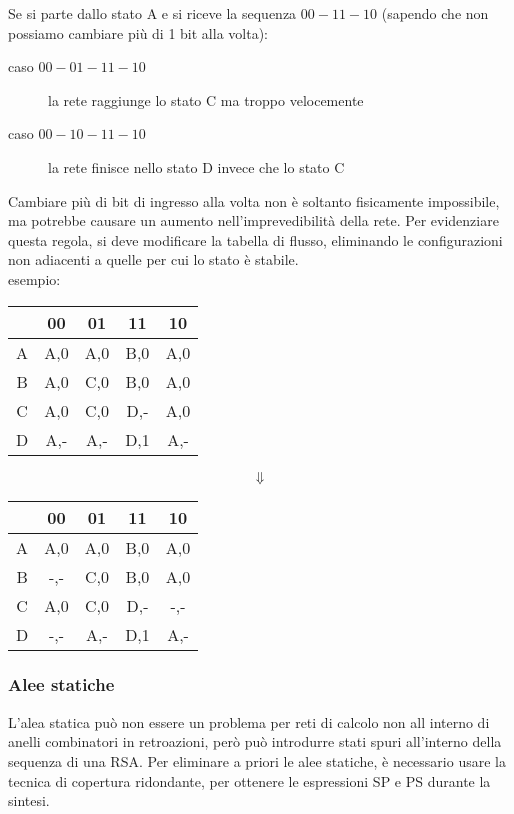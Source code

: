 \documentclass{subfiles}
\begin{document}
\noindent
Se si parte dallo stato A e si riceve la sequenza $00-11-10$ (sapendo che non possiamo cambiare più di 1 bit alla volta):

\begin{description}
	\item[caso $00-01-11-10$] la rete raggiunge lo stato C ma troppo velocemente
	\item[caso $00-10-11-10$] la rete finisce nello stato D invece che lo stato C
\end{description}

\noindent
Cambiare più di bit di ingresso alla volta non è soltanto fisicamente impossibile, ma potrebbe causare un aumento nell'imprevedibilità della rete.
Per evidenziare questa regola, si deve modificare la tabella di flusso, eliminando le configurazioni non adiacenti a quelle per cui lo stato è stabile.\\

\noindent
esempio:

\begin{center}
\begin{tabular}{ |c|c|c|c|c| }
\hline
& 00 & 01 & 11 & 10 \\
\hline
\hline
A & A,0 & A,0 & B,0 & A,0 \\
B & A,0 & C,0 & B,0 & A,0 \\
C & A,0 & C,0 & D,- & A,0 \\
D & A,- & A,- & D,1 & A,- \\
\hline
\end{tabular}

$$\Downarrow$$

\begin{tabular}{ |c|c|c|c|c| }
\hline
& 00 & 01 & 11 & 10 \\
\hline
\hline
A & A,0 & A,0 & B,0 & A,0 \\
B & -,- & C,0 & B,0 & A,0 \\
C & A,0 & C,0 & D,- & -,- \\
D & -,- & A,- & D,1 & A,- \\
\hline
\end{tabular}
\end{center}

\subsubsection{Alee statiche}

L'alea statica può non essere un problema per reti di calcolo non all interno di anelli combinatori in retroazioni, però può introdurre stati spuri all'interno della sequenza di una RSA.
Per eliminare a priori le alee statiche, è necessario usare la tecnica di copertura ridondante, per ottenere le espressioni SP e PS durante la sintesi.
\end{document}
